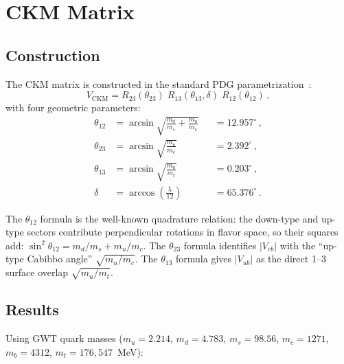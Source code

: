 \documentclass[12pt,a4paper]{article}
\begin{document}
\section{CKM Matrix}

\subsection{Construction}

The CKM matrix is constructed in the standard PDG parametrization~\cite{pdg2024}:
\begin{equation}
  V_{\mathrm{CKM}} = R_{23}(\theta_{23})\;R_{13}(\theta_{13},\delta)\;R_{12}(\theta_{12})\,,
  \label{eq:ckm_construction}
\end{equation}
with four geometric parameters:
\begin{equation}
\boxed{\;
\begin{aligned}
  \theta_{12} &= \arcsin\!\sqrt{\frac{m_d}{m_s}+\frac{m_u}{m_c}}
    &&= 12.957^\circ\,,\\[4pt]
  \theta_{23} &= \arcsin\!\sqrt{\frac{m_u}{m_c}}
    &&= 2.392^\circ\,,\\[4pt]
  \theta_{13} &= \arcsin\!\sqrt{\frac{m_u}{m_t}}
    &&= 0.203^\circ\,,\\[4pt]
  \delta &= \arccos\!\left(\frac{5}{12}\right)
    &&= 65.376^\circ\,.
\end{aligned}
\;}
\label{eq:ckm_angles}
\end{equation}

The $\theta_{12}$ formula is the well-known quadrature relation: the down-type and up-type sectors contribute perpendicular rotations in flavor space, so their squares add: $\sin^2\theta_{12}=m_d/m_s+m_u/m_c$. The $\theta_{23}$ formula identifies $|V_{cb}|$ with the ``up-type Cabibbo angle'' $\sqrt{m_u/m_c}$. The $\theta_{13}$ formula gives $|V_{ub}|$ as the direct 1--3 surface overlap $\sqrt{m_u/m_t}$.

\subsection{Results}

Using GWT quark masses ($m_u=2.214$, $m_d=4.783$, $m_s=98.56$, $m_c=1271$, $m_b=4312$, $m_t=176{,}547$~MeV):
\end{document}
